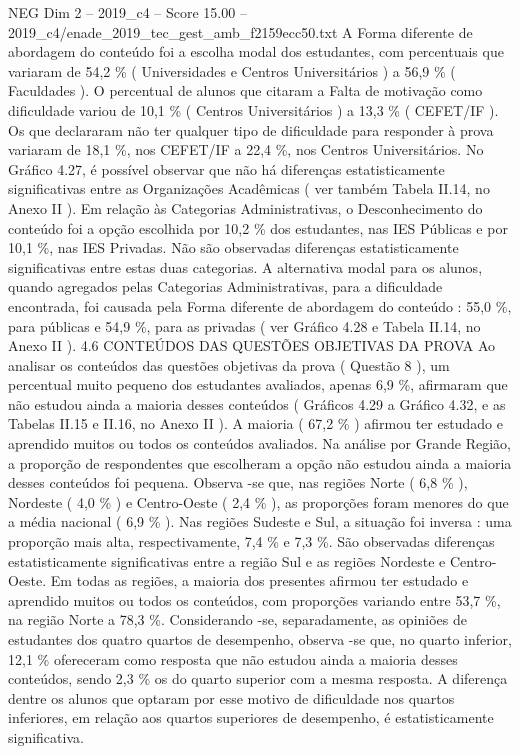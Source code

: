 \begin{textsample}{NEG Dim 2 – 2019\_c4 – Score 15.00 – 2019\_c4/enade\_2019\_tec\_gest\_amb\_f2159ecc50.txt}
A Forma diferente de abordagem do conteúdo foi a escolha modal dos estudantes, com percentuais que variaram de 54,2 \% ( Universidades e Centros Universitários ) a 56,9 \% ( Faculdades ).
O percentual de alunos que citaram a Falta de motivação como dificuldade variou de 10,1 \% ( Centros Universitários ) a 13,3 \% ( CEFET/IF ).
Os que declararam não ter qualquer tipo de dificuldade para responder à prova variaram de 18,1 \%, nos CEFET/IF a 22,4 \%, nos Centros Universitários.
No Gráfico 4.27, é possível observar que não há diferenças estatisticamente significativas entre as Organizações Acadêmicas ( ver também Tabela II.14, no Anexo II ).
Em relação às Categorias Administrativas, o Desconhecimento do conteúdo foi a opção escolhida por 10,2 \% dos estudantes, nas IES Públicas e por 10,1 \%, nas IES Privadas.
Não são observadas diferenças estatisticamente significativas entre estas duas categorias.
A alternativa modal para os alunos, quando agregados pelas Categorias Administrativas, para a dificuldade encontrada, foi causada pela Forma diferente de abordagem do conteúdo : 55,0 \%, para públicas e 54,9 \%, para as privadas ( ver Gráfico 4.28 e Tabela II.14, no Anexo II ). 4.6 CONTEÚDOS DAS QUESTÕES OBJETIVAS DA PROVA Ao analisar os conteúdos das questões objetivas da prova ( Questão 8 ), um percentual muito pequeno dos estudantes avaliados, apenas 6,9 \%, afirmaram que não estudou ainda a maioria desses conteúdos ( Gráficos 4.29 a Gráfico 4.32, e as Tabelas II.15 e II.16, no Anexo II ).
A maioria ( 67,2 \% ) afirmou ter estudado e aprendido muitos ou todos os conteúdos avaliados.
Na análise por Grande Região, a proporção de respondentes que escolheram a opção não estudou ainda a maioria desses conteúdos foi pequena.
Observa -se que, nas regiões Norte ( 6,8 \% ), Nordeste ( 4,0 \% ) e Centro-Oeste ( 2,4 \% ), as proporções foram menores do que a média nacional ( 6,9 \% ).
Nas regiões Sudeste e Sul, a situação foi inversa : uma proporção mais alta, respectivamente, 7,4 \% e 7,3 \%.
São observadas diferenças estatisticamente significativas entre a região Sul e as regiões Nordeste e Centro-Oeste.
Em todas as regiões, a maioria dos presentes afirmou ter estudado e aprendido muitos ou todos os conteúdos, com proporções variando entre 53,7 \%, na região Norte a 78,3 \%.
Considerando -se, separadamente, as opiniões de estudantes dos quatro quartos de desempenho, observa -se que, no quarto inferior, 12,1 \% ofereceram como resposta que não estudou ainda a maioria desses conteúdos, sendo 2,3 \% os do quarto superior com a mesma resposta.
A diferença dentre os alunos que optaram por esse motivo de dificuldade nos quartos inferiores, em relação aos quartos superiores de desempenho, é estatisticamente significativa.

\end{textsample}
